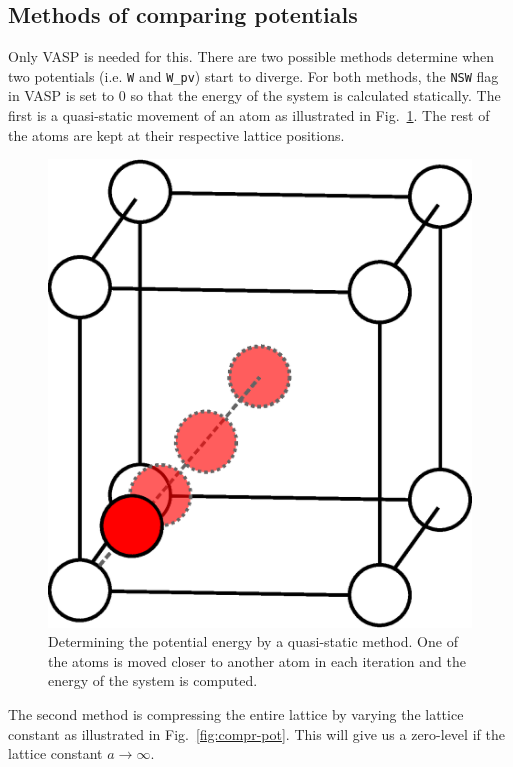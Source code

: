 \documentclass{article}
\begin{document}
\subsection{Methods of comparing potentials}
Only VASP is needed for this. There are two possible methods determine when two potentials (i.e. \texttt{W} and \texttt{W\_pv}) start to diverge. For both methods, the \texttt{NSW} flag in VASP is set to 0 so that the energy of the system is calculated statically. The first is a quasi-static movement of an atom as illustrated in Fig.~\ref{fig:quasi-stat-pot}. The rest of the atoms are kept at their respective lattice positions. 

\begin{figure}[H]
  \centering
  \includegraphics[scale=0.5]{img/quasi-stat-pot2.eps}
  \caption{Determining the potential energy by a quasi-static method. One of the atoms is moved closer to another atom in each iteration and the energy of the system is computed.}
  \label{fig:quasi-stat-pot}
\end{figure}

The second method is compressing the entire lattice by varying the lattice constant as illustrated in Fig.~\ref{fig:compr-pot}. This will give us a zero-level if the lattice constant $a \rightarrow \infty$.
\end{document}
